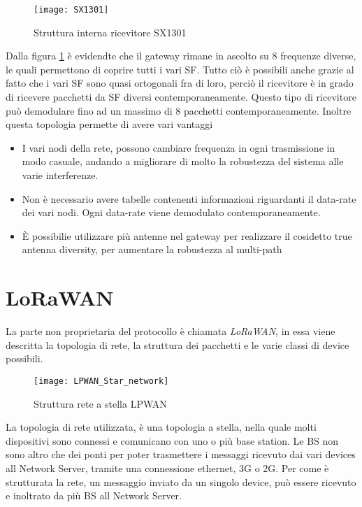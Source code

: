 \begin{figure}[h]
\centering 
\texttt{[image: SX1301]}
\caption{Struttura interna ricevitore SX1301}
\label{fig:sx1301}
\end{figure}

Dalla figura \ref{fig:sx1301} è evidendte che il gateway rimane in ascolto su 8 
frequenze diverse, le quali permettono di coprire tutti i vari SF. 
Tutto ciò è possibili anche grazie al fatto che i vari SF sono quasi ortogonali 
fra di loro, perciò il ricevitore è in grado di ricevere pacchetti da SF diversi 
contemporaneamente. Questo tipo di ricevitore può demodulare fino ad un massimo 
di 8 pacchetti contemporaneamente. Inoltre questa topologia permette di avere 
vari vantaggi
\begin{itemize}
\item I vari nodi della rete, possono cambiare frequenza in ogni trasmissione in
modo casuale, andando a migliorare di molto la robustezza del sistema alle varie
interferenze.
\item Non è necessario avere tabelle contenenti informazioni riguardanti il
data-rate dei vari nodi. Ogni data-rate viene demodulato contemporaneamente.
\item È possibilie utilizzare più antenne nel gateway per realizzare il
cosidetto true antenna diversity, per aumentare la robustezza al multi-path
\end{itemize}

\section{LoRaWAN}
La parte non proprietaria del protocollo è chiamata \emph{LoRaWAN}, in essa
viene descritta la topologia di rete, la struttura dei pacchetti e le varie
classi di device possibili.

\begin{figure}[h]
\centering 
\texttt{[image: LPWAN\_Star\_network]}
\caption{Struttura rete a stella LPWAN}
\end{figure}

La topologia di rete utilizzata, è una topologia a stella, nella quale molti
dispositivi sono connessi e comunicano con uno o più base station. Le BS non
sono altro che dei ponti per poter trasmettere i messaggi ricevuto dai vari
devices all Network Server, tramite una connessione ethernet, 3G o 2G. 
Per come è strutturata la rete, un messaggio inviato
da un singolo device, può essere ricevuto e inoltrato da più BS all Network
Server.

